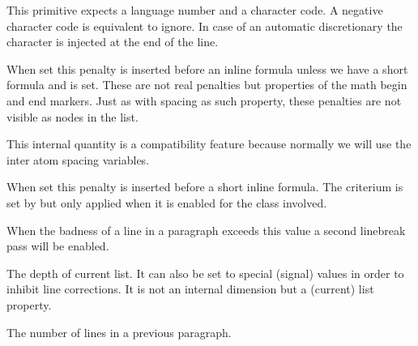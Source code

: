 \startnewprimitive[title={\prm {prehyphenchar}}]

This primitive expects a language number and a character code. A negative
character code is equivalent to ignore. In case of an automatic discretionary the
character is injected at the end of the line.

\stopnewprimitive

\startnewprimitive[title={\prm {preinlinepenalty}}]

When set this penalty is inserted before an inline formula unless we have a short
formula and  is set. These are not real penalties but
properties of the math begin and end markers. Just as with spacing as such
property, these penalties are not visible as nodes in the list.

\stopnewprimitive

\startnewprimitive[title={\prm {prerelpenalty}}]

This internal quantity is a compatibility feature because normally we will use
the inter atom spacing variables.

\stopnewprimitive

\startnewprimitive[title={\prm {preshortinlinepenalty}}]

When set this penalty is inserted before a short inline formula. The criterium is
set by  but only applied when it is enabled for
the class involved.

\stopnewprimitive

\startoldprimitive[title={\prm {pretolerance}}]

When the badness of a line in a paragraph exceeds this value a second linebreak
pass will be enabled.

\stopoldprimitive

\startoldprimitive[title={\prm {prevdepth}}]

The depth of current list. It can also be set to special (signal) values in order
to inhibit line corrections. It is not an internal dimension but a (current) list
property.

\stopoldprimitive

\startoldprimitive[title={\prm {prevgraf}}]

The number of lines in a previous paragraph.

\stopoldprimitive

\startnewprimitive[title={\prm {previousloopiterator}}]

\startbuffer
\edef\testA{
    \expandedrepeat 2 {%
        \expandedrepeat 3 {%
            (\the\previousloopiterator1:\the\currentloopiterator)
        }%
    }%
}
\edef\testB{
    \expandedrepeat 2 {%
        \expandedrepeat 3 {%
            (#P:#I) %
        }%
    }%
}
\stopbuffer

